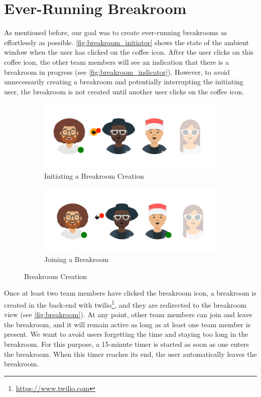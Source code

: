 \section{Ever-Running Breakroom}
As mentioned before, our goal was to create ever-running breakrooms as effortlessly as possible. \autoref{fig:breakroom_initiator} shows the state of the ambient window when the user has clicked on the coffee icon. After the user clicks on this coffee icon, the other team members will see an indication that there is a breakroom in progress (see \autoref{fig:breakroom_indicator}). However, to avoid unnecessarily creating a breakroom and potentially interrupting the initiating user, the breakroom is not created until another user clicks on the coffee icon.

\begin{figure}[h]
    \centering
    \begin{subfigure}{.5\textwidth}
        \centering
        \includegraphics[width=.8\linewidth]{./images/breakroom_initiator.png}
        \caption{Initiating a Breakroom Creation}
        \label{fig:breakroom_initiator}
    \end{subfigure}%
    \begin{subfigure}{.5\textwidth}
        \centering
        \includegraphics[width=.8\linewidth]{./images/breakroom_indicator.png}
        \caption{Joining a Breakroom }
        \label{fig:breakroom_indicator}
    \end{subfigure}
    \caption{Breakroom Creation}
\end{figure}

Once at least two team members have clicked the breakroom icon, a breakroom is created in the back-end with twilio\footnote{\url{https://www.twilio.com}}, and they are redirected to the breakroom view (see \autoref{fig:breakroom}). At any point, other team members can join and leave the breakroom, and it will remain active as long as at least one team member is present. We want to avoid users forgetting the time and staying too long in the breakroom. For this purpose, a 15-minute timer is started as soon as one enters the breakroom. When this timer reaches its end, the user automatically leaves the breakroom.

